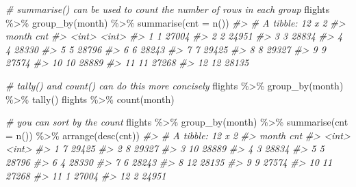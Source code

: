 \documentclass[
]{book}
\newenvironment{Shaded}{\begin{snugshade}}{\end{snugshade}}
\newcommand{\AttributeTok}[1]{\textcolor[rgb]{0.77,0.63,0.00}{#1}}
\newcommand{\CommentTok}[1]{\textcolor[rgb]{0.56,0.35,0.01}{\textit{#1}}}
\newcommand{\FunctionTok}[1]{\textcolor[rgb]{0.00,0.00,0.00}{#1}}
\newcommand{\NormalTok}[1]{#1}
\newcommand{\SpecialCharTok}[1]{\textcolor[rgb]{0.00,0.00,0.00}{#1}}
\begin{document}
\begin{Shaded}
\begin{Highlighting}[]
\CommentTok{\# summarise() can be used to count the number of rows in each group}
\NormalTok{flights }\SpecialCharTok{\%\textgreater{}\%} \FunctionTok{group\_by}\NormalTok{(month) }\SpecialCharTok{\%\textgreater{}\%} \FunctionTok{summarise}\NormalTok{(}\AttributeTok{cnt =} \FunctionTok{n}\NormalTok{())}
\CommentTok{\#\textgreater{} \# A tibble: 12 x 2}
\CommentTok{\#\textgreater{}    month   cnt}
\CommentTok{\#\textgreater{}    \textless{}int\textgreater{} \textless{}int\textgreater{}}
\CommentTok{\#\textgreater{}  1     1 27004}
\CommentTok{\#\textgreater{}  2     2 24951}
\CommentTok{\#\textgreater{}  3     3 28834}
\CommentTok{\#\textgreater{}  4     4 28330}
\CommentTok{\#\textgreater{}  5     5 28796}
\CommentTok{\#\textgreater{}  6     6 28243}
\CommentTok{\#\textgreater{}  7     7 29425}
\CommentTok{\#\textgreater{}  8     8 29327}
\CommentTok{\#\textgreater{}  9     9 27574}
\CommentTok{\#\textgreater{} 10    10 28889}
\CommentTok{\#\textgreater{} 11    11 27268}
\CommentTok{\#\textgreater{} 12    12 28135}
\end{Highlighting}
\end{Shaded}

\begin{Shaded}
\begin{Highlighting}[]
\CommentTok{\# tally() and count() can do this more concisely}
\NormalTok{flights }\SpecialCharTok{\%\textgreater{}\%} \FunctionTok{group\_by}\NormalTok{(month) }\SpecialCharTok{\%\textgreater{}\%} \FunctionTok{tally}\NormalTok{()}
\NormalTok{flights }\SpecialCharTok{\%\textgreater{}\%} \FunctionTok{count}\NormalTok{(month)}
\end{Highlighting}
\end{Shaded}

\begin{Shaded}
\begin{Highlighting}[]
\CommentTok{\# you can sort by the count}
\NormalTok{flights }\SpecialCharTok{\%\textgreater{}\%} \FunctionTok{group\_by}\NormalTok{(month) }\SpecialCharTok{\%\textgreater{}\%} \FunctionTok{summarise}\NormalTok{(}\AttributeTok{cnt =} \FunctionTok{n}\NormalTok{()) }\SpecialCharTok{\%\textgreater{}\%} \FunctionTok{arrange}\NormalTok{(}\FunctionTok{desc}\NormalTok{(cnt))}
\CommentTok{\#\textgreater{} \# A tibble: 12 x 2}
\CommentTok{\#\textgreater{}    month   cnt}
\CommentTok{\#\textgreater{}    \textless{}int\textgreater{} \textless{}int\textgreater{}}
\CommentTok{\#\textgreater{}  1     7 29425}
\CommentTok{\#\textgreater{}  2     8 29327}
\CommentTok{\#\textgreater{}  3    10 28889}
\CommentTok{\#\textgreater{}  4     3 28834}
\CommentTok{\#\textgreater{}  5     5 28796}
\CommentTok{\#\textgreater{}  6     4 28330}
\CommentTok{\#\textgreater{}  7     6 28243}
\CommentTok{\#\textgreater{}  8    12 28135}
\CommentTok{\#\textgreater{}  9     9 27574}
\CommentTok{\#\textgreater{} 10    11 27268}
\CommentTok{\#\textgreater{} 11     1 27004}
\CommentTok{\#\textgreater{} 12     2 24951}
\end{Highlighting}
\end{Shaded}
\end{document}
